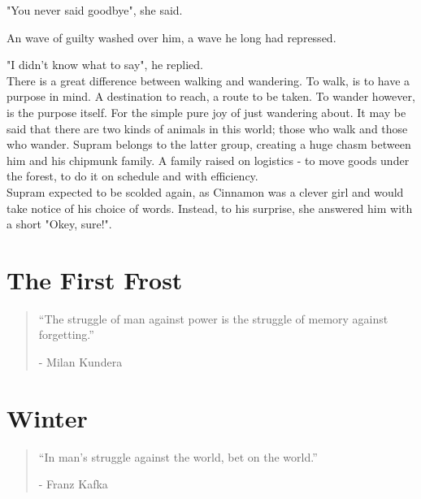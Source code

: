 \documentclass[smalldemyvopaper,11pt,twoside,onecolumn,openright,extrafontsizes]{memoir}
\begin{document}
"You never said goodbye", she said. 

An wave of guilty washed over him, a wave he long had repressed.

"I didn't know what to say", he replied. \\

 



There is a great difference between walking and wandering. To walk, is to have a purpose in mind. A destination to reach, a route to be taken. To wander however, is the purpose itself. For the simple pure joy of just wandering about. It may be said that there are two kinds of animals in this world; those who walk and those who wander. Supram belongs to the latter group, creating a huge chasm between him and his chipmunk family. A family raised on logistics - to move goods under the forest, to do it on schedule and with efficiency. \\

Supram expected to be scolded again, as Cinnamon was a clever girl and would take notice of his choice of words. Instead, to his surprise, she answered him with a short "Okey, sure!".


\chapter{The First Frost}

\vspace{-1.3cm}
\begin{localsize}{10}
	\begin{quote}
		“The struggle of man against power is the struggle of memory against forgetting.”
		\begin{flushright}- Milan Kundera \end{flushright}
	\end{quote} 
\end{localsize}
\vspace{1cm}

\chapter{Winter}

\vspace{-1.3cm}
\begin{localsize}{10}
	\begin{quote}
		“In man's struggle against the world, bet on the world.”
		\begin{flushright}- Franz Kafka \end{flushright}
	\end{quote} 
\end{localsize}
\vspace{1cm}
\end{document}

